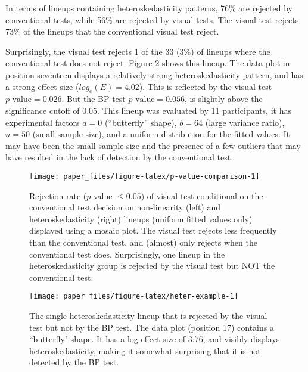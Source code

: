 \documentclass[]{interact}
\theoremstyle{plain}%
\theoremstyle{definition}
\theoremstyle{remark}
\begin{document}
In terms of lineups containing heteroskedasticity patterns, 76\% are
rejected by conventional tests, while 56\% are rejected by visual tests.
The visual test rejects 73\% of the lineups that the conventional visual
test reject.

Surprisingly, the visual test rejects 1 of the 33 (3\%) of lineups where
the conventional test does not reject. Figure \ref{fig:heter-example}
shows this lineup. The data plot in position seventeen displays a
relatively strong heteroskedasticity pattern, and has a strong effect
size (\(log_e(E)=4.02\)). This is reflected by the visual test
\(p\text{-value} = 0.026\). But the BP test \(p\text{-value} = 0.056\),
is slightly above the significance cutoff of \(0.05\). This lineup was
evaluated by 11 participants, it has experimental factors \(a = 0\)
(``butterfly'' shape), \(b = 64\) (large variance ratio), \(n = 50\)
(small sample size), and a uniform distribution for the fitted values.
It may have been the small sample size and the presence of a few
outliers that may have resulted in the lack of detection by the
conventional test.

\begin{figure}

{\centering \texttt{[image: paper\_files/figure-latex/p-value-comparison-1]} 

}

\caption{Rejection rate ($p$-value $\leq0.05$) of visual test conditional on the conventional test decision on non-linearity (left) and heteroskedasticity (right) lineups (uniform fitted values only) displayed using a mosaic plot. The visual test rejects less frequently than the conventional test, and (almost) only rejects when the conventional test does. Surprisingly, one lineup in the heteroskedasticity group is rejected by the visual test but NOT the conventional test.}\label{fig:p-value-comparison}
\end{figure}

\begin{figure}[t!]

{\centering \texttt{[image: paper\_files/figure-latex/heter-example-1]} 

}

\caption{The single heteroskedasticity lineup that is rejected by the visual test but not by the BP test. The data plot (position 17) contains a ``butterfly" shape. It has a log effect size of $ 3.76$, and visibly displays heteroskedasticity, making it somewhat surprising that it is not detected by the BP test.}\label{fig:heter-example}
\end{figure}
\end{document}

